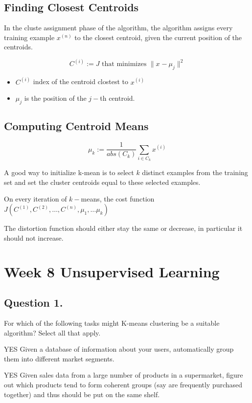 \documentclass[11pt]{article} %
\begin{document}
\subsection*{Finding Closest Centroids}

In the cluste assignment phase of the algorithm, the algorithm assigns every training example $x^{(n)}$ to the closest 
centroid, given the current position of the centroids.

\[ C^{(i)} := J \mbox{ that minimizes } \| x^{} - \mu_j \| ^2 \]

\begin{itemize}
	\item $C^{(i)}$ index of the centroid clostest to $x^{(i)}$
	\item $\mu_j$ is the position of the $j-$th centroid.
\end{itemize}

\subsection{Computing Centroid Means}

\[ 
\mu_k := \frac{1}{abs(C_k)} \sum_{i \in C_k} x^{(i)}
\]

A good way to initialize k-mean is to select $k$ distinct examples from the training set and set the cluster centroids equal to these selected examples.

On every iteration of $k-$means, the cost function $J(C^{(1)},C^{(2)},\ldots, C^{(n)},
\mu_1,\ldots \mu_k)$

The distortion function should either stay the same or decrease, in particular it should not increase.


\section{Week 8 Unsupervised Learning}

\subsection{ Question 1. } 
For which of the following tasks might K-means clustering be a suitable algorithm? Select all that apply.

YES Given a database of information about your users, automatically group them into different market segments.

YES Given sales data from a large number of products in a supermarket, figure out which products tend to form coherent groups (say are frequently purchased together) and thus should be put on the same shelf.
\end{document}
